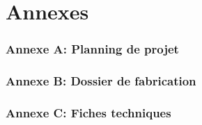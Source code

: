 \section*{Annexes}

\subsubsection*{Annexe A: Planning de projet}

\subsubsection*{Annexe B: Dossier de fabrication}

\subsubsection*{Annexe C: Fiches techniques}

\iffalse

    \clearpage
    \vspace*{\fill}
    \begin{center}
        \begin{minipage}{.6\textwidth}
            \centerline{\Huge{Annexe A}}
        \end{minipage}
    \end{center}
    \vfill %
    \clearpage

    

    \clearpage
    \vspace*{\fill}
    \begin{center}
        \begin{minipage}{.6\textwidth}
            \centerline{\Huge{Annexe B}}
        \end{minipage}
    \end{center}
    \vfill %
    \clearpage

    
    
    
    

    \clearpage
    \vspace*{\fill}
    \begin{center}
        \begin{minipage}{.6\textwidth}
            \centerline{\Huge{Annexe C}}
        \end{minipage}
    \end{center}
    \vfill %
    \clearpage

    

    

\fi